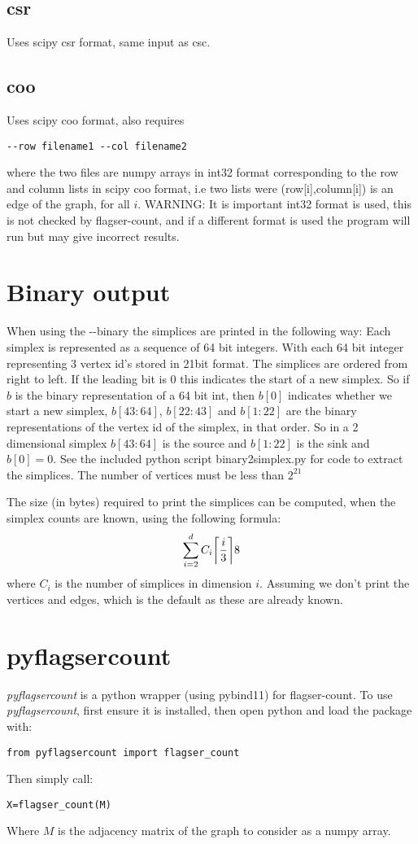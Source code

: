 \documentclass{amsart}
\theoremstyle{definition}
\let\originalleft\left
\let\originalright\right
\renewcommand{\left}{\mathopen{}\mathclose\bgroup\originalleft}
\renewcommand{\right}{\aftergroup\egroup\originalright}
\begin{document}
\subsection{csr}
Uses scipy csr format, same input as csc.

\subsection{coo}
Uses scipy coo format, also requires
\begin{verbatim}--row filename1 --col filename2\end{verbatim}
 where the two files are numpy arrays in int32 format corresponding to the row and column lists in scipy coo format, i.e two lists were (row[i],column[i]) is an edge of the graph, for all $i$. WARNING: It is important int32 format is used, this is not checked by flagser-count, and if a different format is used the program will run but may give incorrect results.

\section{Binary output}
When using the -{}-binary the simplices are printed in the following way: Each simplex is represented as a sequence of 64 bit integers. With each 64 bit integer representing 3 vertex id's stored in 21bit format. The simplices are ordered from right to left. If the leading bit is 0 this indicates the start of a new simplex. So if $b$ is the binary representation of a 64 bit int, then $b[0]$ indicates whether we start a new simplex, $b[43:64]$, $b[22:43]$ and $b[1:22]$ are the binary representations of the vertex id of the simplex, in that order. So in a 2 dimensional simplex $b[43:64]$ is the source and $b[1:22]$ is the sink and $b[0]=0$. See the included python script binary2simplex.py for code to extract the simplices. The number of vertices must be less than $2^{21}$

The size (in bytes) required to print the simplices can be computed, when the simplex counts are known, using the following formula:
$$ \sum_{i=2}^{d}C_i\left\lceil\frac{i}{3}\right\rceil8$$
where $C_i$ is the number of simplices in dimension $i$. Assuming we don't print the vertices and edges, which is the default as these are already known.

\section{pyflagsercount}
\textit{pyflagsercount} is a python wrapper (using pybind11) for flagser-count.
To use \textit{pyflagsercount}, first ensure it is installed, then open python and load the package with:
\begin{verbatim}from pyflagsercount import flagser_count\end{verbatim}
Then simply call:
\begin{verbatim}X=flagser_count(M)\end{verbatim}
Where $M$ is the adjacency matrix of the graph to consider as a numpy array.
\end{document}
